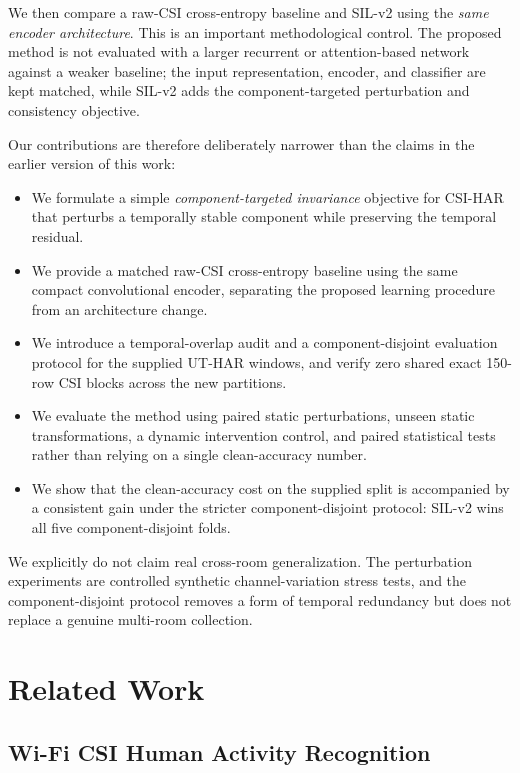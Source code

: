 \documentclass[runningheads]{llncs}
\newcommand{\method}{SIL-v2}
\begin{document}
We then compare a raw-CSI cross-entropy baseline and \method{} using the \emph{same encoder architecture}. This is an important methodological control. The proposed method is not evaluated with a larger recurrent or attention-based network against a weaker baseline; the input representation, encoder, and classifier are kept matched, while \method{} adds the component-targeted perturbation and consistency objective.

Our contributions are therefore deliberately narrower than the claims in the earlier version of this work:

\begin{itemize}[leftmargin=*]
    \item We formulate a simple \emph{component-targeted invariance} objective for CSI-HAR that perturbs a temporally stable component while preserving the temporal residual.
    \item We provide a matched raw-CSI cross-entropy baseline using the same compact convolutional encoder, separating the proposed learning procedure from an architecture change.
    \item We introduce a temporal-overlap audit and a component-disjoint evaluation protocol for the supplied UT-HAR windows, and verify zero shared exact 150-row CSI blocks across the new partitions.
    \item We evaluate the method using paired static perturbations, unseen static transformations, a dynamic intervention control, and paired statistical tests rather than relying on a single clean-accuracy number.
    \item We show that the clean-accuracy cost on the supplied split is accompanied by a consistent gain under the stricter component-disjoint protocol: \method{} wins all five component-disjoint folds.
\end{itemize}

We explicitly do not claim real cross-room generalization. The perturbation experiments are controlled synthetic channel-variation stress tests, and the component-disjoint protocol removes a form of temporal redundancy but does not replace a genuine multi-room collection.

\section{Related Work}

\subsection{Wi-Fi CSI Human Activity Recognition}
\end{document}
